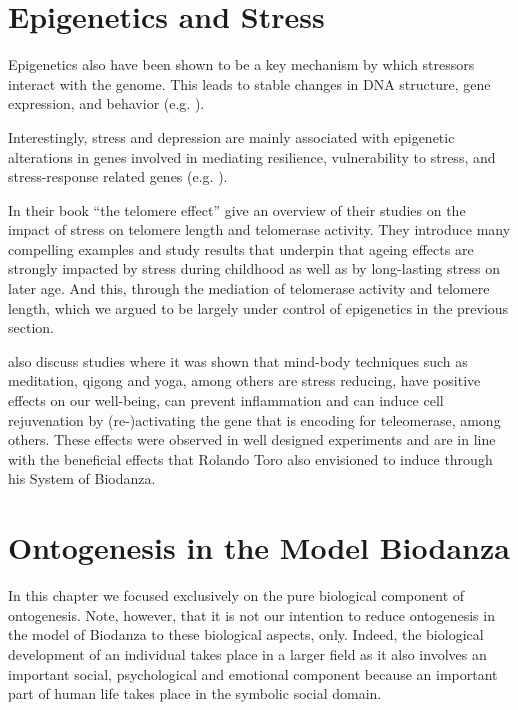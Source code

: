 \documentclass[
  11pt,
]{book}
\begin{document}
\hypertarget{epigenetics-and-stress}{%
\section{Epigenetics and Stress}\label{epigenetics-and-stress}}

Epigenetics also have been shown to be a key mechanism by which stressors interact with the genome.
This leads to stable changes in DNA structure, gene expression, and behavior (e.g. \citet{Park2019}).

Interestingly, stress and depression are mainly
associated with epigenetic alterations in genes involved in mediating resilience, vulnerability to stress, and stress-response related genes (e.g. \citet{Park2019}).

In their book ``the telomere effect'' \citet{BlackburnEpel2017} give an overview of their studies on the impact of stress on telomere length and telomerase activity.
They introduce many compelling examples and study results that underpin that ageing effects are strongly impacted by stress during childhood as well as by long-lasting stress on later age. And this, through the mediation of telomerase activity and telomere length, which we argued to be largely under control of epigenetics in the previous section.

\citet{BlackburnEpel2017} also discuss studies where it was shown that mind-body techniques such as meditation, qigong and yoga, among others are stress reducing, have positive effects on our well-being, can prevent inflammation and can induce cell rejuvenation by (re-)activating the gene that is encoding for teleomerase, among others. These effects were observed in well designed experiments and are in line with the beneficial effects that Rolando Toro also envisioned to induce through his System of Biodanza.

\hypertarget{ontogenesis-in-the-model-biodanza}{%
\section{Ontogenesis in the Model Biodanza}\label{ontogenesis-in-the-model-biodanza}}

In this chapter we focused exclusively on the pure biological component of ontogenesis. Note, however, that it is not our intention to reduce ontogenesis in the model of Biodanza to these biological aspects, only. Indeed, the biological development of an individual takes place in a larger field as it also involves an important social, psychological and emotional component because an important part of human life takes place in the symbolic social domain.
\end{document}
